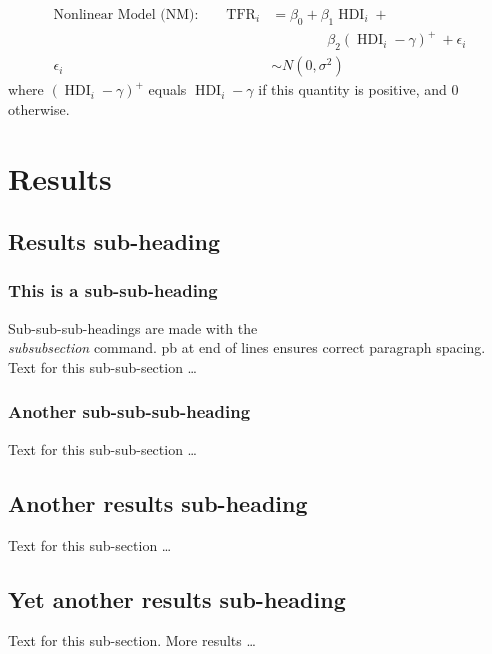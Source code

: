 \documentclass[10pt]{bmc_article}
\def\TFR{\operatorname{TFR}}
\def\HDI{\operatorname{HDI}}
\newenvironment{bmcformat}{\begin{raggedright}\baselineskip20pt\sloppy\setboolean{publ}{false}}{\end{raggedright}\baselineskip20pt\sloppy}
\begin{document}
\begin{bmcformat}
\begin{align*}
\text{Nonlinear Model (NM):}\qquad
\TFR_i &= \beta_0 + \beta_1 \HDI_i + \\
&\qquad \qquad\beta_2(\HDI_i - \gamma)^+ \ + \epsilon_i\\
\epsilon_i &\sim N(0, \sigma^2)
\end{align*}
where $(\HDI_i - \gamma)^+$ equals $\HDI_i - \gamma$ if this quantity
is positive, and $0$ otherwise.




 

\section*{Results}
  \subsection*{Results sub-heading}
    \subsubsection*{This is a sub-sub-heading}
      Sub-sub-sub-headings are made with the \textsl{\\subsubsection} command. \pb
      pb at end of lines ensures correct paragraph spacing.\pb
	  Text for this sub-sub-section \ldots
    \subsubsection*{Another sub-sub-sub-heading}
      Text for this sub-sub-section \ldots

  \subsection*{Another results sub-heading}
    Text for this sub-section \ldots

  \subsection*{Yet another results sub-heading}
    Text for this sub-section.  More results \ldots


\end{bmcformat}
\end{document}
